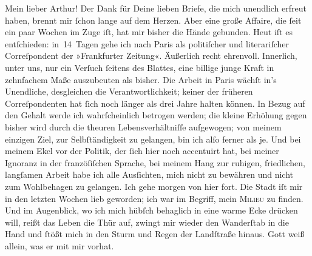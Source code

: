 \pstart\center{}Mein lieber Arthur!\pend\vspace{0.5em}
\pstart
           Der Dank für Deine lieben Briefe, die mich unendlich erfreut haben, brennt mir{ }ſchon
               lange auf dem Herzen. Aber eine große Affaire, die{ }ſeit ein paar Wochen im Zuge iſt,
               hat mir bisher die Hände gebunden. Heut iſt es entſchieden: in 14 Tagen gehe ich nach
                  Paris als politiſcher und literariſcher
               Correſpondent der »Frankfurter Zeitung«.
               Äußerlich recht ehrenvoll. Innerlich, unter uns, nur ein Verſuch{ }ſeitens des Blattes, eine billige junge
               Kraft in zehnfachem Maße auszubeuten als bisher. Die Arbeit in Paris wächſt in’s Unendliche, desgleichen die
               Verantwortlichkeit; keiner der früheren Correſpondenten {\pb}hat{ }ſich noch länger als drei Jahre halten können.
               In Bezug auf den Gehalt werde ich wahrſcheinlich betrogen werden; die kleine Erhöhung
               gegen bisher wird durch die theuren Lebensverhältniſſe aufgewogen; von meinem
               einzigen Ziel, zur Selbſtändigkeit zu  gelangen, bin ich alſo ferner als je. Und bei meinem Ekel vor der Politik, der{ }ſich hier noch  accentuirt hat, bei meiner Ignoranz
               in der franzöſiſchen Sprache, bei meinem Hang zur ruhigen, \strikeout{\textcolor{gray}{ſt}} friedlichen, langſamen Arbeit habe ich alle Ausſichten, mich nicht zu bewähren
               und nicht zum Wohlbehagen zu gelangen. Ich gehe morgen
               von hier fort. Die Stadt iſt
               mir in den letzten Wochen lieb geworden; ich war im Begriff, mein \textsc{Milieu} zu finden. Und im Augenblick, wo ich mich hübſch
               behaglich in eine warme Ecke drücken will, {\pb} reißt das Leben die Thür auf, zwingt mir wieder
               den Wanderſtab  in die Hand und{ }ſtößt mich in
               den Sturm und Regen der Landſtraße hinaus. Gott weiß allein, was er mit mir
               vorhat.\pend
           
